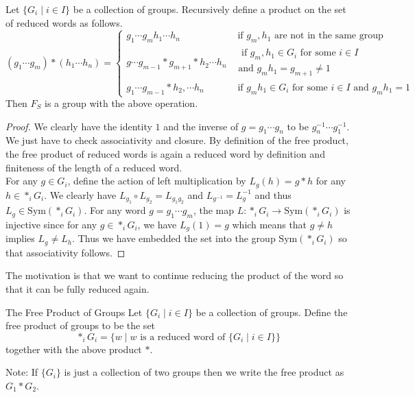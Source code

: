 \documentclass[a4paper]{article}
\begin{document}
\begin{prp}{}{} Let $\{G_i\;|\;i\in I\}$ be a collection of groups. Recursively define a product on the set of reduced words as follows. $$(g_1\cdots g_m)\ast(h_1\cdots h_n)=\begin{cases}
g_1\cdots g_mh_1\cdots h_n& \text{ if $g_m,h_1$ are not in the same group }\\
g\cdots g_{m-1}\ast g_{m+1}\ast h_2\cdots h_n & \substack{\text{ if }g_m,h_1\in G_i \text{ for some }i\in I\\\text{and }g_mh_1=g_{m+1}\neq 1}\\
g_1\cdots g_{m-1}\ast h_2,\cdots h_n & \text{ if $g_mh_1\in G_i$ for some $i\in I$ and $g_mh_1=1$}
\end{cases}$$
Then $F_S$ is a group with the above operation. 
\begin{proof}
We clearly have the identity $1$ and the inverse of $g=g_1\cdots g_n$ to be $g_n^{-1}\cdots g_1^{-1}$. We just have to check associativity and closure. By definition of the free product, the free product of reduced words is again a reduced word by definition and finiteness of the length of a reduced word. \\
For any $g\in G_i$, define the action of left multiplication by $L_g(h)=g\ast h$ for any $h\in\ast_iG_i$. We clearly have $L_{g_1}\circ L_{g_2}=L_{g_1g_2}$ and $L_{g^{-1}}=L_g^{-1}$ and thus $L_g\in\text{Sym}(\ast_iG_i)$. For any word $g=g_1\cdots g_m$, the map $L:\ast_iG_i\to\text{Sym}(\ast_iG_i)$ is injective since for any $g\in\ast_iG_i$, we have $L_g(1)=g$ which means that $g\neq h$ implies $L_g\neq L_h$. Thus we have embedded the set into the group $\text{Sym}(\ast_iG_i)$ so that associativity follows. 
\end{proof}
\end{prp}

The motivation is that we want to continue reducing the product of the word so that it can be fully reduced again. 

\begin{defn}{The Free Product of Groups}{} Let $\{G_i\;|\;i\in I\}$ be a collection of groups. Define the free product of groups to be the set $$\ast_i G_i=\{w\;|\;w\text{ is a reduced word of }\{G_i\;|\;i\in I\}\}$$ together with the above product $\ast$. 
\end{defn}

Note: If $\{G_i\}$ is just a collection of two groups then we write the free product as $G_1\ast G_2$. \\
\end{document}
